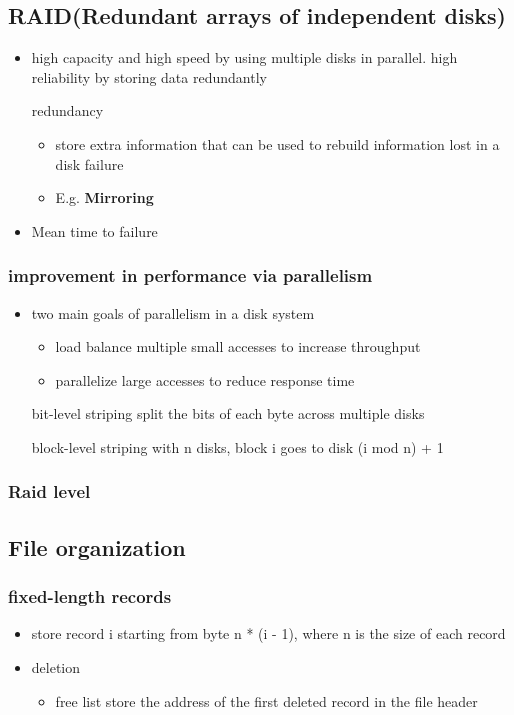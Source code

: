 \documentclass[11pt]{article}
\begin{document}
\subsection{RAID(Redundant arrays of independent disks)}
\label{sec-14-3}
\begin{itemize}
\item high capacity and high speed by using multiple disks in parallel.
high reliability by storing data redundantly
\item[{redundancy}] \begin{itemize}
\item store extra information that can be used to rebuild information
lost in a disk failure
\item E.g. \textbf{Mirroring}
\end{itemize}
\item Mean time to failure
\end{itemize}
\subsubsection{improvement in performance via parallelism}
\label{sec-14-3-1}
\begin{itemize}
\item two main goals of parallelism in a disk system
\begin{itemize}
\item load balance multiple small accesses to increase throughput
\item parallelize large accesses to reduce response time
\end{itemize}
\item[{bit-level striping}] split the bits of each byte across multiple disks
\item[{block-level striping}] with n disks, block i goes to disk (i mod n) + 1
\end{itemize}
\subsubsection{Raid level}
\label{sec-14-3-2}
\subsection{File organization}
\label{sec-14-4}
\subsubsection{fixed-length records}
\label{sec-14-4-1}
\begin{itemize}
\item store record i starting from byte n * (i - 1), where n is the size of each record
\item deletion
\begin{itemize}
\item free list
store the address of the first deleted record in the file header
\end{itemize}
\end{itemize}
\end{document}
